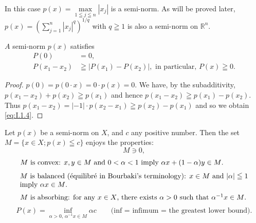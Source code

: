 In this case $p(x) = \max\limits_{1 \leqq j \leqq n} |x_j|$ is a semi-norm. As will be proved later, $p(x) = \left(\sum\limits_{j=1}^{n} |x_j|^q\right)^{1/q}$ with $q \geqq 1$ is also a semi-norm on $\mathbb{R}^{n}$. 

\begin{proposition}\label{prop:I.1.Proposition.1} $A$ semi-norm $p(x)$ satisfies 
\begin{align}
P(0)& = 0, \label{eq:I.1.3} \\
P\left(x_{1}- x_{2}\right)& \geqq | P\left(x_{1}\right)- P\left(x_{2}\right) |, \text{ in particular, } P(x) \geqq 0. \label{eq:I.1.4}
\end{align}
\end{proposition}

\begin{proof}
 $p(0) = p(0 \cdot x) = 0 \cdot p(x) = 0$. We have, by the subadditivity, $p(x_1- x_2) + p(x_2) \geqq p(x_1)$ and hence $p(x_1- x_2) \geqq p(x_1)- p(x_2)$. Thus $p(x_1- x_2) = |-1| \cdot p(x_2- x_1) \geqq p(x_2)- p(x_1)$ and so we obtain \eqref{eq:I.1.4}. 
\end{proof}

\begin{proposition}\label{prop:I.1.Proposition.2} Let $p(x)$ be a semi-norm on $X$, and $c$ any positive number. Then the set $M = \{x \in X; p(x) \leqq c\}$ enjoys the properties: 
\begin{equation}\label{eq:I.1.5}
M\ni0,
\end{equation}
\begin{equation}\label{eq:I.1.6}
\begin{minipage}{0.92\linewidth}
\everymath{}\let\limits\nolimits
$M$ is convex: $x,y\in M$ and $0<\alpha<1$ imply $\alpha x+(1-\alpha)y\in M$.
\end{minipage}
\end{equation}
\begin{equation}\label{eq:I.1.7}
\begin{minipage}{0.92\linewidth}
\everymath{}\let\limits\nolimits
$M$ is balanced (équilibré in Bourbaki's terminology): $x\in M$ and $|\alpha|\leqq1$ imply $\alpha x\in M$.
\end{minipage}
\end{equation}
\begin{equation}\label{eq:I.1.8}
\begin{minipage}{0.92\linewidth}
\everymath{}\let\limits\nolimits
$M$ is absorbing: for any $x\in X$, there exists $\alpha>0$ such that $\alpha^{-1}x\in M$.
\end{minipage}
\end{equation}
\begin{equation}\label{eq:I.1.9}
P(x)=\inf_{\alpha>0,\,\alpha^{-1}x\in M}\alpha c
\qquad\text{(inf = infimum = the greatest lower bound).}
\end{equation}
\end{proposition}

